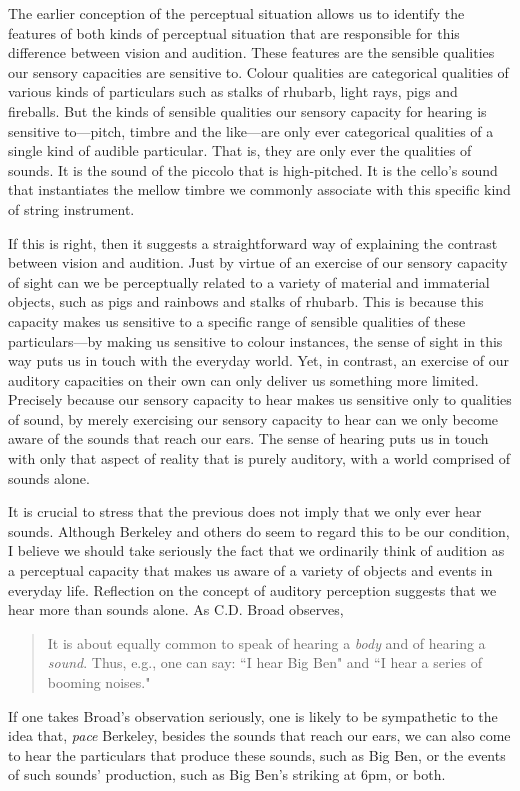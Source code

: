 \documentclass[sloppy, journal, bytitle, dodraft]{humapap}
\begin{document}
The earlier conception of the perceptual situation  allows us to identify the features of both kinds of perceptual situation that are responsible for this difference between vision and audition. These features are the sensible qualities our sensory capacities are sensitive to. Colour qualities are categorical qualities of various kinds of particulars such as stalks of rhubarb, light rays, pigs and fireballs. But the kinds of sensible qualities our sensory capacity for hearing is sensitive to---pitch, timbre and the like---are only ever categorical qualities of a single kind of audible particular. That is, they are only ever the qualities of sounds. It is the sound of the piccolo that is high-pitched. It is the cello's sound that instantiates the mellow timbre we commonly associate with this specific kind of string instrument. 

If this is right, then it suggests a straightforward way of explaining the contrast between vision and audition. Just by virtue of an exercise of our sensory capacity of sight can we be perceptually related to a variety of material and immaterial objects, such as pigs and rainbows and stalks of rhubarb. This is because this capacity makes us sensitive to a specific range of sensible qualities of these particulars---by making us sensitive to colour instances, the sense of sight in this way puts us in touch with the everyday world. Yet, in contrast, an exercise of our auditory capacities on their own can only deliver us something more limited. Precisely because our sensory capacity to hear makes us sensitive only to qualities of sound, by merely exercising our sensory capacity to hear can we only become aware of the sounds that reach our ears. The sense of hearing puts us in touch with only that aspect of reality that is purely auditory, with a world comprised of sounds alone. 

It is crucial to stress that the previous does not imply that we only ever hear sounds. Although Berkeley and others do seem to regard this to be our condition, I believe we should take seriously the fact that we ordinarily think of audition as a perceptual capacity that makes us aware of a variety of objects and events in everyday life. Reflection on the concept of auditory perception suggests that we hear more than sounds alone. As C.D. Broad observes, 
\begin{quote}
It is about equally common to speak of hearing a \emph{body} and of hearing a \emph{sound}. Thus, e.g., one can say: ``I hear Big Ben" and ``I hear a series of booming noises."\autocite[p.4]{broad1952aa}
\end{quote}
If one takes Broad's observation seriously, one is likely to be sympathetic to the idea that, \emph{pace} Berkeley, besides the sounds that reach our ears, we can also come to hear the particulars that produce these sounds, such as Big Ben, or the events of such sounds' production, such as Big Ben's striking at 6pm, or both. 
\end{document}
